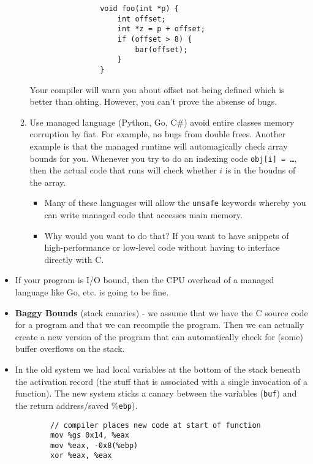\documentclass[12pt]{article}
\theoremstyle{definition}
\begin{document}
\begin{itemize}
\begin{enumerate}
            \begin{lstlisting}
                void foo(int *p) {
                    int offset;
                    int *z = p + offset;
                    if (offset > 8) {
                        bar(offset);
                    }
                }
            \end{lstlisting}
            Your compiler will warn you about offset not being defined which is better than ohting. However, you can't prove the absense of bugs.
            \item  Use managed language (Python, Go, C\#) avoid entire classes memory corruption by fiat. For example, no bugs from double frees. Another example is that the managed runtime will automagically check array bounds for you. Whenever you try to do an indexing code \texttt{obj[i] = \ldots}, then the actual code that runs will check whether $i$ is in the boudns of the array. 
            \begin{itemize}
            \item Many of these languages will allow the \texttt{unsafe} keywords whereby you can write managed code that accesses main memory.
            \item Why would you want to do that? If you want to have snippets of high-performance or low-level code without having to interface directly with C.
            \end{itemize}
        \end{enumerate}
    \item If your program is I/O bound, then the CPU overhead of a managed language like Go, etc. is going to be fine.
    \item \textbf{Baggy Bounds} (stack canaries) - we assume that we have the C source code for a program and that we can recompile the program. Then we can actually create a new version of the program that can automatically check for (some) buffer overflows on the stack.
    \item In the old system we had local variables at the bottom of the stack beneath the activation record (the stuff that is associated with a single invocation of a function). The new system sticks a canary between the variables (\texttt{buf}) and the return address/saved \%\texttt{ebp}).
    \begin{lstlisting}
        // compiler places new code at start of function
        mov %gs 0x14, %eax 
        mov %eax, -0x8(%ebp)
        xor %eax, %eax


\end{lstlisting}
\end{itemize}
\end{document}
